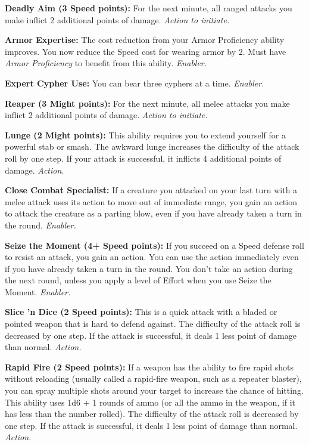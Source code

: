 \documentclass[a4paper,10pt,final,twocolumn,oneside]{book}
\newcommand{\itemAbility}[2]{\textcolor{25gray}{\textbullet\textbf{ #1:}}{ #2}\par}
\newcommand{\enabler}{\textit{ Enabler.}}
\newcommand{\action}{\textit{ Action.}}
\newcommand{\actionInit}{\textit{ Action to initiate.}}
\begin{document}
\itemAbility{Deadly Aim (3 Speed points)}{For the next minute, all ranged attacks you make inflict 2 additional points of damage.\actionInit}

\itemAbility{Armor Expertise}{The cost reduction from your Armor Proficiency ability improves. You now reduce the Speed cost for wearing armor by 2. Must have \textit{Armor Proficiency} to benefit from this ability.\enabler}

\itemAbility{Expert Cypher Use}{You can bear three cyphers at a time.\enabler}

\itemAbility{Reaper (3 Might points)}{For the next minute, all melee attacks you make inflict 2 additional points of damage.\actionInit}

\itemAbility{Lunge (2 Might points)}{This ability requires you to extend yourself for a powerful stab or smash. The awkward lunge increases the difficulty of the attack roll by one step. If your attack is successful, it inflicts 4 additional points of damage.\action}

\itemAbility{Close Combat Specialist}{If a creature you attacked on your last turn with a melee attack uses its action to move out of immediate range, you gain an action to attack the creature as a parting blow, even if you have already taken a turn in the round.\enabler}

\itemAbility{Seize the Moment (4+ Speed points)}{If you succeed on a Speed defense roll to resist an attack, you gain an action. You can use the action immediately even if you have already taken a turn in the round. You don’t take an action during the next round, unless you apply a level of Effort when you use Seize the Moment.\enabler}

\itemAbility{Slice 'n Dice (2 Speed points)}{This is a quick attack with a bladed or pointed weapon that is hard to defend against. The difficulty of the attack roll is decreased by one step. If the attack is successful, it deals 1 less point of damage than normal.\action}

\itemAbility{Rapid Fire (2 Speed points)}{If a weapon has the ability to fire rapid shots without reloading (usually called a rapid-fire weapon, such as a repeater blaster), you can spray multiple shots around your target to increase the chance of hitting. This ability uses 1d6 + 1 rounds of ammo (or all the ammo in the weapon, if it has less than the number rolled). The difficulty of the attack roll is decreased by one step. If the attack is successful, it deals 1 less point of damage than normal.\action}
\end{document}
